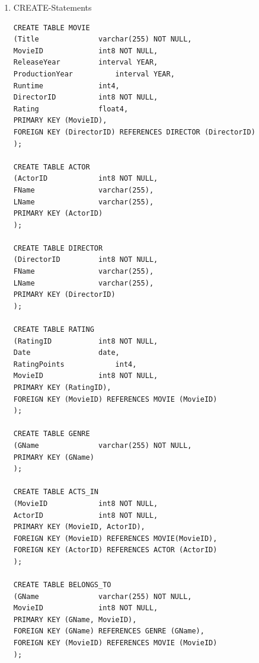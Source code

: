 \documentclass[a4paper,11pt]{article}
\begin{document}
\begin{enumerate}
\item CREATE-Statements
\begin{lstlisting}
CREATE TABLE MOVIE 
(Title				varchar(255) NOT NULL,
MovieID				int8 NOT NULL,
ReleaseYear			interval YEAR,
ProductionYear			interval YEAR,
Runtime				int4,
DirectorID			int8 NOT NULL,
Rating				float4,
PRIMARY KEY (MovieID),
FOREIGN KEY (DirectorID) REFERENCES DIRECTOR (DirectorID)
);

CREATE TABLE ACTOR
(ActorID			int8 NOT NULL,
FName				varchar(255),
LName				varchar(255),
PRIMARY KEY (ActorID)
);

CREATE TABLE DIRECTOR
(DirectorID			int8 NOT NULL,
FName				varchar(255),
LName 				varchar(255),
PRIMARY KEY (DirectorID)
);

CREATE TABLE RATING
(RatingID			int8 NOT NULL,
Date				date,
RatingPoints			int4,
MovieID				int8 NOT NULL,
PRIMARY KEY (RatingID),
FOREIGN KEY (MovieID) REFERENCES MOVIE (MovieID)
);

CREATE TABLE GENRE
(GName				varchar(255) NOT NULL,
PRIMARY KEY (GName)
);

CREATE TABLE ACTS_IN
(MovieID			int8 NOT NULL,
ActorID				int8 NOT NULL,
PRIMARY KEY (MovieID, ActorID),
FOREIGN KEY (MovieID) REFERENCES MOVIE(MovieID),
FOREIGN KEY (ActorID) REFERENCES ACTOR (ActorID)
);

CREATE TABLE BELONGS_TO
(GName				varchar(255) NOT NULL,
MovieID				int8 NOT NULL,
PRIMARY KEY (GName, MovieID),
FOREIGN KEY (GName) REFERENCES GENRE (GName),
FOREIGN KEY (MovieID) REFERENCES MOVIE (MovieID)
);


\end{lstlisting}
\end{enumerate}
\end{document}
